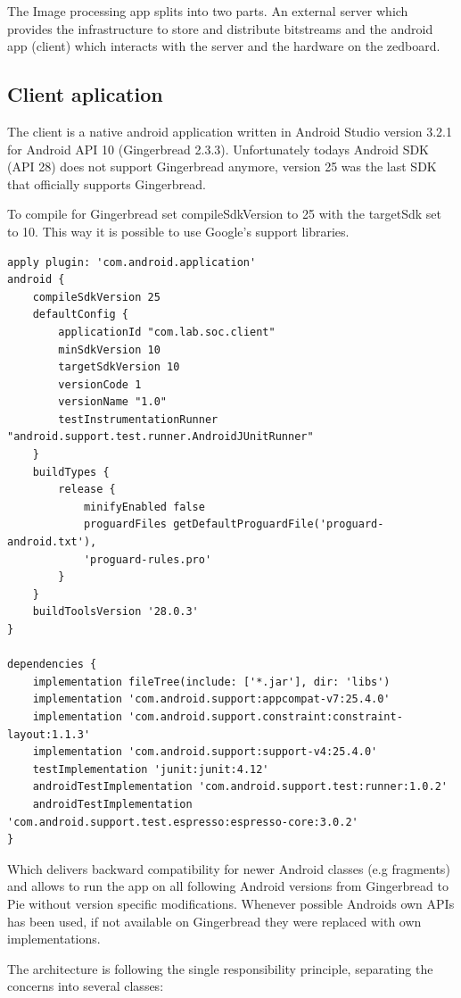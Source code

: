 The Image processing app splits into two parts. An external server which provides the infrastructure to store and distribute bitstreams and 
the android app (client) which interacts with the server and the hardware on the zedboard. 

\subsection{Client aplication}

The client is a native android application written in Android Studio version 3.2.1 for Android API 10 (Gingerbread 2.3.3).
Unfortunately todays Android SDK (API 28) does not support Gingerbread anymore, version 25 was the last SDK that officially supports Gingerbread.

To compile for Gingerbread set compileSdkVersion to 25 with the
targetSdk set to 10. This way it is possible to use Google's support libraries.

\begin{verbatim}
apply plugin: 'com.android.application'
android {
    compileSdkVersion 25
    defaultConfig {
        applicationId "com.lab.soc.client"
        minSdkVersion 10
        targetSdkVersion 10
        versionCode 1
        versionName "1.0"
        testInstrumentationRunner "android.support.test.runner.AndroidJUnitRunner"
    }
    buildTypes {
        release {
            minifyEnabled false
            proguardFiles getDefaultProguardFile('proguard-android.txt'), 
            'proguard-rules.pro'
        }
    }
    buildToolsVersion '28.0.3'
}

dependencies {
    implementation fileTree(include: ['*.jar'], dir: 'libs')
    implementation 'com.android.support:appcompat-v7:25.4.0'
    implementation 'com.android.support.constraint:constraint-layout:1.1.3'
    implementation 'com.android.support:support-v4:25.4.0'
    testImplementation 'junit:junit:4.12'
    androidTestImplementation 'com.android.support.test:runner:1.0.2'
    androidTestImplementation 'com.android.support.test.espresso:espresso-core:3.0.2'
}    
\end{verbatim}


Which delivers backward compatibility for newer Android classes (e.g fragments) and allows to run the app on all following Android versions from Gingerbread to Pie without version specific modifications.
Whenever possible Androids own APIs has been used, if not available on Gingerbread they were replaced with own implementations.

The architecture is following the single responsibility principle, separating the concerns into several classes:

